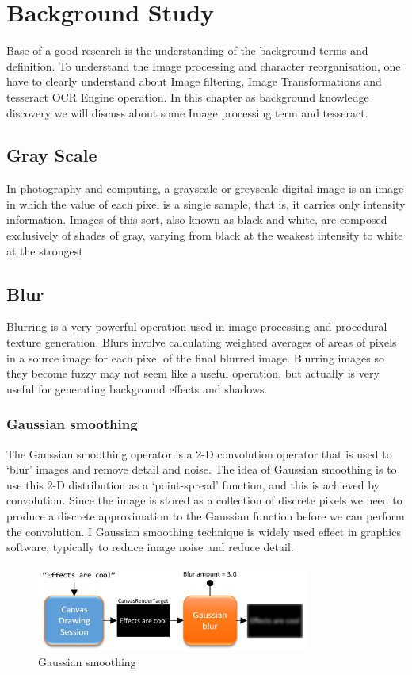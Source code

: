 \chapter {Background Study}
\label{background_study}
Base of a good research is the understanding of the background terms and definition. To understand the Image processing and character reorganisation, one have to clearly understand about Image filtering, Image Transformations and tesseract OCR Engine operation. In this chapter as background knowledge discovery we will discuss about some Image processing term and tesseract.

\section{Gray Scale}
In photography and computing, a grayscale or greyscale digital image is an image in which the value of each pixel is a single sample, that is, it carries only intensity information. Images of this sort, also known as black-and-white, are composed exclusively of shades of gray, varying from black at the weakest intensity to white at the strongest

\section{Blur}
Blurring is a very powerful operation used in image processing and procedural texture generation. Blurs involve calculating weighted averages of areas of pixels in a source image for each pixel of the final blurred image. Blurring images so they become fuzzy may not seem like a useful operation, but actually is very useful for generating background effects and shadows.

\subsection{Gaussian smoothing}
The Gaussian smoothing operator is a 2-D convolution operator that is used to `blur' images and remove detail and noise. The idea of Gaussian smoothing is to use this 2-D distribution as a `point-spread' function, and this is achieved by convolution. Since the image is stored as a collection of discrete pixels we need to produce a discrete approximation to the Gaussian function before we can perform the convolution. I Gaussian smoothing technique is widely used effect in graphics software, typically to reduce image noise and reduce detail.
\begin{figure}[H]
\centering
\label{fig:Blur} 
\includegraphics[width=0.8\textwidth]{Blur.png}
\caption {Gaussian smoothing}
\end{figure}

